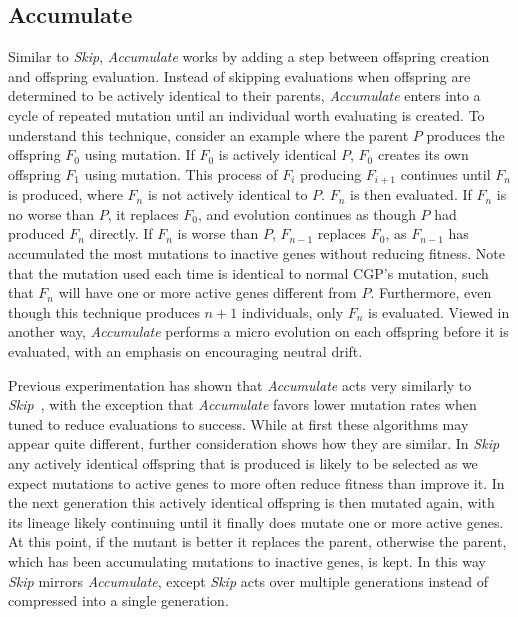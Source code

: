 \documentclass[journal]{IEEEtran}
\begin{document}
\subsection{Accumulate}
Similar to \emph{Skip}, \emph{Accumulate} works by adding a step between offspring
creation and offspring evaluation.  Instead of skipping evaluations when offspring
are determined to be actively identical to their parents, \emph{Accumulate} enters
into a cycle of repeated mutation until an individual worth evaluating is created.
To understand this technique, consider an example where the parent $P$ produces
the offspring $F_0$ using mutation. If $F_0$ is actively identical $P$, $F_0$
creates its own offspring $F_1$ using mutation.  This process of $F_i$ producing
$F_{i+1}$ continues until $F_n$ is produced, where $F_n$ is not actively identical
to $P$.  $F_n$ is then evaluated.  If $F_n$ is no worse than $P$, it replaces
$F_0$, and evolution continues as though $P$ had produced $F_n$ directly.  If
$F_n$ is worse than $P$, $F_{n-1}$ replaces $F_0$, as $F_{n-1}$ has accumulated
the most mutations to inactive genes without reducing fitness.  Note that
the mutation used each time is identical to normal CGP's mutation, such that
$F_n$ will have one or more active genes different from $P$.  Furthermore, even
though this technique produces $n+1$ individuals, only $F_n$ is evaluated.
Viewed in another way, \emph{Accumulate} performs a micro evolution on each offspring
before it is evaluated, with an emphasis on encouraging neutral drift.

Previous experimentation has shown that \emph{Accumulate} acts very similarly to
\emph{Skip}~\cite{goldman:2013:cgpwaste}, with the exception that \emph{Accumulate}
favors lower mutation rates when tuned to reduce evaluations to success. While at first these algorithms may appear
quite different, further consideration shows how they are similar.  In \emph{Skip}
any actively identical offspring that is produced is likely to be selected as we expect mutations to
active genes to more often reduce fitness than improve it.  In the next generation
this actively identical offspring is then mutated again, with its lineage likely
continuing until it finally does mutate one or more active genes.  At this point, if the
mutant is better it replaces the parent, otherwise the parent, which has been accumulating
mutations to inactive genes, is kept.  In this way \emph{Skip} mirrors \emph{Accumulate},
except \emph{Skip} acts over multiple generations instead of compressed into a single generation.
\end{document}
